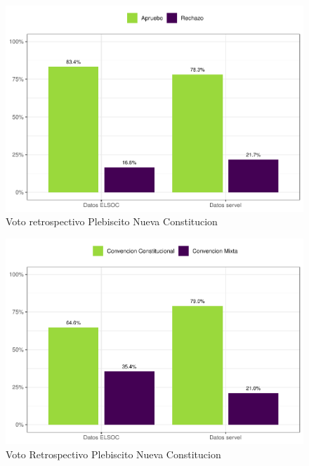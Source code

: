 \documentclass[
  12pt,
]{book}
\begin{document}
\begin{figure}

{\centering \includegraphics{reporte-elsoc_files/figure-latex/servel-apruebo-1} 

}

\caption{Voto retrospectivo Plebiscito Nueva Constitucion}\label{fig:servel-apruebo}
\end{figure}

\begin{figure}

{\centering \includegraphics{reporte-elsoc_files/figure-latex/servel-cc-1} 

}

\caption{Voto Retrospectivo Plebiscito Nueva Constitucion}\label{fig:servel-cc}
\end{figure}
\end{document}

